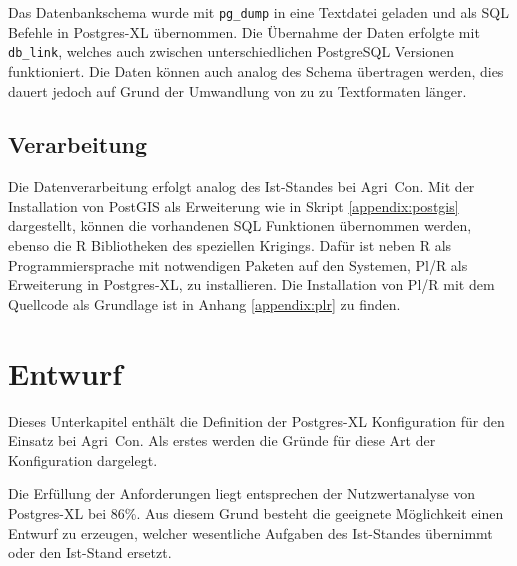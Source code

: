 Das Datenbankschema wurde mit \verb+pg_dump+ in eine Textdatei geladen und als SQL Befehle in Postgres-XL übernommen.
Die Übernahme der Daten erfolgte mit \verb+db_link+, welches auch zwischen unterschiedlichen PostgreSQL Versionen funktioniert.
Die Daten können auch analog des Schema übertragen werden, dies dauert jedoch auf Grund der Umwandlung von zu zu Textformaten länger.

\subsection{Verarbeitung}
Die Datenverarbeitung erfolgt analog des Ist-Standes bei Agri~Con.
Mit der Installation von PostGIS als Erweiterung wie in Skript \ref{appendix:postgis} dargestellt, können die vorhandenen SQL Funktionen übernommen werden, ebenso die R Bibliotheken des speziellen Krigings.
Dafür ist neben R als Programmiersprache mit notwendigen Paketen auf den Systemen, Pl/R als Erweiterung in Postgres-XL, zu installieren.
Die Installation von Pl/R mit dem Quellcode als Grundlage ist in Anhang \ref{appendix:plr} zu finden.

\section{Entwurf}
Dieses Unterkapitel enthält die Definition der Postgres-XL Konfiguration für den Einsatz bei Agri~Con.
Als erstes werden die Gründe für diese Art der Konfiguration dargelegt.

Die Erfüllung der Anforderungen liegt entsprechen der Nutzwertanalyse von Postgres-XL bei 86\%{}.
Aus diesem Grund besteht die geeignete Möglichkeit einen Entwurf zu erzeugen, welcher wesentliche Aufgaben des Ist-Standes übernimmt oder den Ist-Stand ersetzt.

